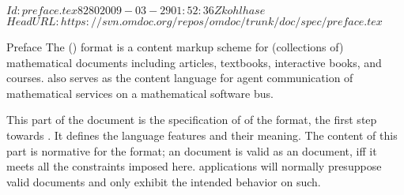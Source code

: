 \svnInfo $Id: preface.tex 8280 2009-03-29 01:52:36Z kohlhase $
\svnKeyword $HeadURL: https://svn.omdoc.org/repos/omdoc/trunk/doc/spec/preface.tex $

\begin{omgroup}[id=preface,display=flow]{Preface}
 The {\omdoc} (\explainomdocacronym) format is a content markup scheme for (collections of)
mathematical documents including articles, textbooks, interactive books, and courses.
{\omdoc} also serves as the content language for agent communication of mathematical
services on a mathematical software bus.

This {\ifbook part of the {\report}\else document\fi} is the specification of {}
of the {\omdoc} format, the first step towards {}. It defines the {\omdoc}
language features and their meaning. The content of this part is normative for the
{\omdoc} format; an {\omdoc} document is valid as an {\omdoc} document, iff it meets all
the constraints imposed here. {\omdoc} applications will normally presuppose valid
{\omdoc} documents and only exhibit the intended behavior on such.
\end{omgroup}





